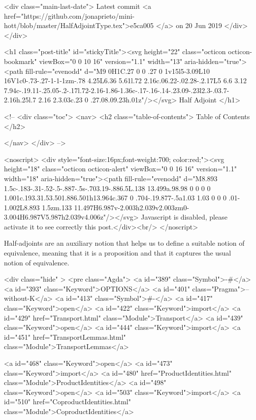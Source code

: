     <div class="main-last-date">
      Latest commit <a href="https://github.com/jonaprieto/mini-hott/blob/master/HalfAdjointType.tex">e5ca005 </a> on  20 Jun 2019
    </div>
  </div>
  
  <h1 class="post-title" id="stickyTitle"><svg height="22" class="octicon octicon-bookmark" viewBox="0 0 10 16" version="1.1" width="13" aria-hidden="true"><path fill-rule="evenodd" d="M9 0H1C.27 0 0 .27 0 1v15l5-3.09L10 16V1c0-.73-.27-1-1-1zm-.78 4.25L6.36 5.61l.72 2.16c.06.22-.02.28-.2.17L5 6.6 3.12 7.94c-.19.11-.25.05-.2-.17l.72-2.16-1.86-1.36c-.17-.16-.14-.23.09-.23l2.3-.03.7-2.16h.25l.7 2.16 2.3.03c.23 0 .27.08.09.23h.01z"/></svg> Half Adjoint
  </h1>

  <!-- 
  <div class="toc">
    <nav>
    <h2 class="table-of-contents"> Table of Contents </h2>
      

    </nav>
  </div>
   -->

  <noscript>
  <div style="font-size:16px;font-weight:700; color:red;"><svg height="18" class="octicon octicon-alert" viewBox="0 0 16 16" version="1.1" width="18" aria-hidden="true"><path fill-rule="evenodd" d="M8.893 1.5c-.183-.31-.52-.5-.887-.5s-.703.19-.886.5L.138 13.499a.98.98 0 0 0 0 1.001c.193.31.53.501.886.501h13.964c.367 0 .704-.19.877-.5a1.03 1.03 0 0 0 .01-1.002L8.893 1.5zm.133 11.497H6.987v-2.003h2.039v2.003zm0-3.004H6.987V5.987h2.039v4.006z"/></svg> Javascript is disabled, please activate it to see correctly this post.</div><br/>
  </noscript>

  Half-adjoints are an auxiliary notion that helps us to define a suitable notion
of equivalence, meaning that it is a proposition and that it captures the usual
notion of equivalence.

<div class="hide" >
<pre class="Agda">
<a id="389" class="Symbol">{-#</a> <a id="393" class="Keyword">OPTIONS</a> <a id="401" class="Pragma">--without-K</a> <a id="413" class="Symbol">#-}</a>
<a id="417" class="Keyword">open</a> <a id="422" class="Keyword">import</a> <a id="429" href="Transport.html" class="Module">Transport</a>
<a id="439" class="Keyword">open</a> <a id="444" class="Keyword">import</a> <a id="451" href="TransportLemmas.html" class="Module">TransportLemmas</a>

<a id="468" class="Keyword">open</a> <a id="473" class="Keyword">import</a> <a id="480" href="ProductIdentities.html" class="Module">ProductIdentities</a>
<a id="498" class="Keyword">open</a> <a id="503" class="Keyword">import</a> <a id="510" href="CoproductIdentities.html" class="Module">CoproductIdentities</a>

